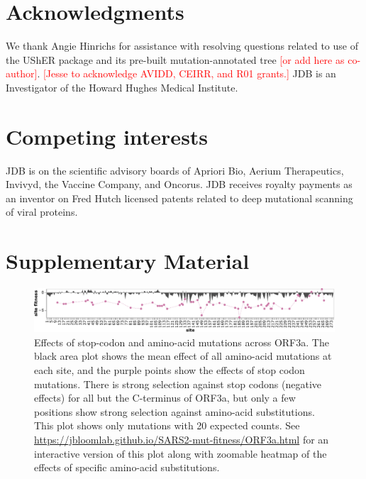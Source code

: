 \documentclass[9pt,twocolumn,twoside]{gsajnl_modified}
\newcommand\jdbcomment[1]{\textcolor{red}{[#1]}}
\begin{document}
{\section{Acknowledgments}
We thank Angie Hinrichs for assistance with resolving questions related to use of the UShER package and its pre-built mutation-annotated tree \jdbcomment{or add here as co-author}.
\jdbcomment{Jesse to acknowledge AVIDD, CEIRR, and R01 grants.}
JDB is an Investigator of the Howard Hughes Medical Institute.

\section{Competing interests}
JDB is on the scientific advisory boards of Apriori Bio, Aerium Therapeutics, Invivyd, the Vaccine Company, and Oncorus.
JDB receives royalty payments as an inventor on Fred Hutch licensed patents related to deep mutational scanning of viral proteins.


}

\onecolumn
\renewcommand{\thepage}{S\arabic{page}}
\setcounter{page}{1}
\renewcommand{\thefigure}{S\arabic{figure}}
\setcounter{figure}{0}

\clearpage

\section{Supplementary Material}

\begin{figure}[h]
\includegraphics[width=\linewidth]{figs/ORF3a.pdf}
\caption{
Effects of stop-codon and amino-acid mutations across ORF3a.
The black area plot shows the mean effect of all amino-acid mutations at each site, and the purple points show the effects of stop codon mutations.
There is strong selection against stop codons (negative effects) for all but the C-terminus of ORF3a, but only a few positions show strong selection against amino-acid substitutions.
This plot shows only mutations with 20 expected counts.
See \url{https://jbloomlab.github.io/SARS2-mut-fitness/ORF3a.html} for an interactive version of this plot along with zoomable heatmap of the effects of specific amino-acid substitutions.
\label{fig:ORF3a}
}
\end{figure}
\end{document}
